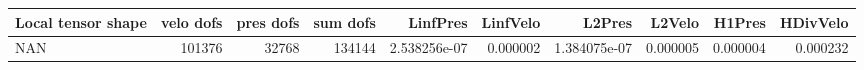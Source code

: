\begin{tabular}{lrrrrrrrrr}
\toprule
Local tensor shape &  velo dofs &  pres dofs &  sum dofs &     LinfPres &  LinfVelo &       L2Pres &   L2Velo &   H1Pres &  HDivVelo \\
\midrule
               NAN &     101376 &      32768 &    134144 & 2.538256e-07 &  0.000002 & 1.384075e-07 & 0.000005 & 0.000004 &  0.000232 \\
\bottomrule
\end{tabular}
